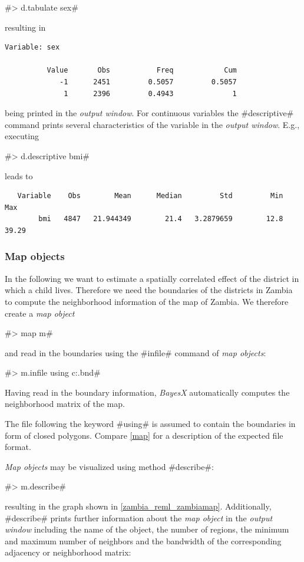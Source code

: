 #> d.tabulate sex#

resulting in

\begin{verbatim}
Variable: sex

          Value       Obs           Freq            Cum
             -1      2451         0.5057         0.5057
              1      2396         0.4943              1
\end{verbatim}

being printed in the {\it output window}. For continuous variables
the #descriptive# command prints several characteristics of the
variable in the {\em output window}. E.g., executing

#> d.descriptive bmi#

leads to

\begin{verbatim}
   Variable    Obs        Mean      Median         Std         Min         Max
        bmi   4847   21.944349        21.4   3.2879659        12.8       39.29
\end{verbatim}

\subsubsection{Map objects}\label{zambia_reml_maps}

In the following we want to estimate a spatially correlated effect
of the district in which a child lives. Therefore we need the
boundaries of the districts in Zambia to compute the neighborhood
information of the map of Zambia. We therefore create a {\it map
object}

#> map m#

and read in the boundaries using the #infile# command of {\it map
objects}:

#> m.infile using c:\data\zambia.bnd#

Having read in the boundary information, {\it BayesX}
automatically computes the neighborhood matrix of the map.

The file following the keyword #using# is assumed to contain the
boundaries in form of closed polygons. Compare \autoref{map} for a
description of the expected file format.

{\it Map objects} may be visualized using method #describe#:

#> m.describe#

resulting in the graph shown in \autoref{zambia_reml_zambiamap}.
Additionally, #describe# prints further information about the {\it
map object} in the {\it output window} including the name of the
object, the number of regions, the minimum and maximum number of
neighbors and the bandwidth of the corresponding adjacency or
neighborhood matrix:

